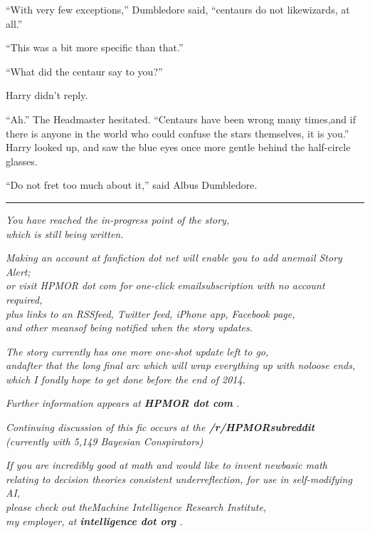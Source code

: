 ``With very few exceptions,'' Dumbledore said, ``centaurs do not likewizards, at all.''

``This was a bit more specific than that.''

``What did the centaur say to you?''

Harry didn't reply.

``Ah.'' The Headmaster hesitated. ``Centaurs have been wrong many times,and if there is anyone in the world who could confuse the stars themselves, it is you.''
Harry looked up, and saw the blue eyes once more gentle behind the half-circle glasses.

``Do not fret too much about it,'' said Albus Dumbledore.

\begin{center}\rule{3in}{0.4pt}\end{center}

\emph{You have reached the in-progress point of the story,}\\
\emph{which is still being written.}

\emph{Making an account at fanfiction dot net will enable you to add anemail Story Alert;}\\ \emph{or visit HPMOR dot com for one-click emailsubscription with no account required,}\\ \emph{plus links to an RSSfeed, Twitter feed, iPhone app, Facebook page,}\\ \emph{and other meansof being notified when the story updates.}

\emph{The story currently has one more one-shot update left to go,\\ andafter that the long final arc which will wrap everything up with noloose ends,\\ which I fondly hope to get done before the end of 2014.}

\emph{Further information appears at \textbf{HPMOR dot com} .}

\emph{Continuing discussion of this fic occurs at the \textbf{/r/HPMORsubreddit}}\\ \emph{(currently with 5,149 Bayesian Conspirators)}

\emph{If you are incredibly good at math and would like to invent newbasic math}\\ \emph{relating to decision theories consistent underreflection, for use in self-modifying AI,}\\ \emph{please check out theMachine Intelligence Research Institute,}\\ \emph{my employer, at
\textbf{intelligence dot org} .}

